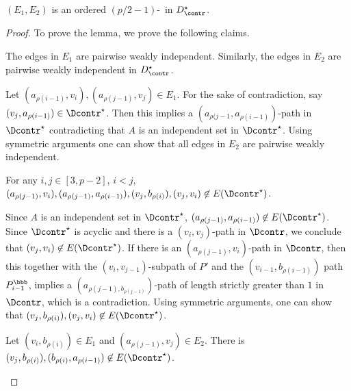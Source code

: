\begin{lemma}\label{lem:long-path-ordered-tough-pair}
$(E_1,E_2)$ is an ordered $(p/2-1)$-\toughpair\ in $D^{\star}_{\contr}$.
\end{lemma}

\begin{proof}
To prove the lemma, we prove the following claims.

\begin{claim}\label{claim:biclique-long-path-weak}
The edges in $E_1$ are pairwise weakly independent. Similarly, the edges in $E_2$ are pairwise weakly independent in $D^{\star}_{\contr}$.
\end{claim}

\begin{claimproof}
Let $(a_{\rho(i-1)},{v}_{i}), \allowbreak (a_{\rho(j-1)},{v}_{j}) \in E_1$. For the sake of contradiction, say $(v_j, a_{\rho(i-1)}) \in \Dcontr^{\star}$. Then this implies a $(a_{\rho(j-1},a_{\rho(i-1)})$-path in $\Dcontr^{\star}$ contradicting that $A$ is an independent set in $\Dcontr^{\star}$.
Using symmetric arguments one can show that all edges in $E_2$ are pairwise weakly independent.
\end{claimproof}

\begin{claim}\label{claim:biclique-long-path-ordered}
For any $i,j \in [3, p-2]$, $i <j$, $(a_{\rho(j-1)}, v_{i}), \allowbreak (a_{\rho(j-1)}, a_{\rho(i-1)}),  \allowbreak ({v}_{j},  \allowbreak b_{\rho(i)}), \allowbreak (v_j,v_i) \not \in E(\Dcontr^{\star})$.
\end{claim}

\begin{claimproof}
Since $A$ is an independent set in $\Dcontr^{\star}$, $(a_{\rho(j-1)}, a_{\rho(i-1)}) \not \in E(\Dcontr^{\star})$. Since $\Dcontr^{\star}$ is acyclic and there is a $(v_i,v_j)$-path in $\Dcontr$, we conclude that $(v_j,v_i) \not \in E(\Dcontr^{\star})$.
If there is an $(a_{\rho(j-1)}, {v}_{i})$-path in $\Dcontr$, then this together with the $( {v}_{i},v_{j-1})$-subpath of $P'$ and the $(v_{i-1},b_{\rho(i-1)})$ path $P^{\bbb}_{i-1}$, implies a $(a_{\rho(j-1),b_{\rho(j-1)}})$-path of length strictly greater than $1$ in $\Dcontr$, which is a contradiction. Using symmetric arguments, one can show that 
$({v}_{j}, b_{\rho(i)}), (v_j,v_i) \not \in E(\Dcontr^{\star})$.
\end{claimproof}

\begin{claim}\label{claim:biclique-long-path-weak-between}
Let $(v_i,b_{\rho(i)}) \in E_1$ and $(a_{\rho(j-1)},v_j) \in E_2$.
There is $(v_j,b_{\rho(i)}), (b_{\rho(i)},a_{\rho(i-1)}) \not \in E(\Dcontr^{\star})$. 
\end{claim}


\end{proof}
